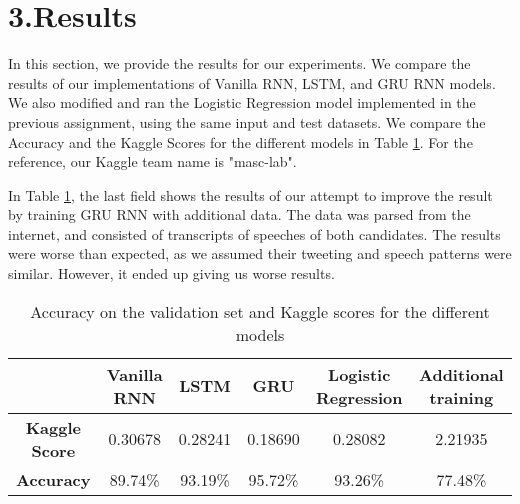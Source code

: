 
\section*{3.Results}

In this section, we provide the results for our experiments. We compare the results of our implementations of Vanilla RNN, LSTM, and GRU RNN models. We also modified and ran the Logistic Regression model implemented in the previous assignment, using the same input and test datasets. We compare the Accuracy and the Kaggle Scores for the different models in Table  \ref{result-table}. For the reference, our Kaggle team name is "masc-lab". 

In Table \ref{result-table}, the last field shows the results of our attempt to improve the result by training GRU RNN with additional data. The data was parsed from the internet, and consisted of transcripts of speeches of both candidates. The results were worse than expected, as we assumed their tweeting and speech patterns were similar. However, it ended up giving us worse results.

\begin{table}[h]
\centering
\begin{tabular}{|c|c|c|c|c|c|}
\hline
                      & \textbf{Vanilla RNN} & \textbf{LSTM} & \textbf{GRU} & \textbf{Logistic Regression} & \textbf{Additional training}\\ \hline
\textbf{Kaggle Score} &   0.30678            &  0.28241      &   0.18690    &  0.28082     &   2.21935      \\ \hline
\textbf{Accuracy}     &   89.74\%            &  93.19\%        &   95.72\%  &   93.26\%       &   77.48\%      \\ \hline
\end{tabular}
\caption{Accuracy on the validation set and Kaggle scores for the different models}
\label{result-table}
\end{table}

